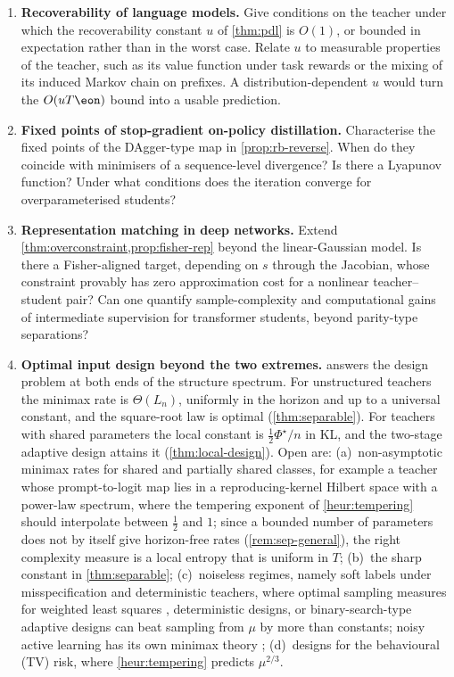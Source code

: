 \begin{enumerate}[leftmargin=*,label=\textbf{P\arabic*.}]
\item \textbf{Recoverability of language models.} Give conditions on the teacher under which the
recoverability constant $u$ of \cref{thm:pdl} is $O(1)$, or bounded in expectation rather than in the worst case.
Relate $u$ to measurable properties of the teacher, such as its value function under task rewards or the
mixing of its induced Markov chain on prefixes. A distribution-dependent $u$ would turn the $O(uT\eon)$
bound into a usable prediction.

\item \textbf{Fixed points of stop-gradient on-policy distillation.} Characterise the fixed points of the
DAgger-type map in \cref{prop:rb-reverse}. When do they coincide with minimisers of a sequence-level
divergence? Is there a Lyapunov function? Under what conditions does the iteration converge for
overparameterised students?

\item \textbf{Representation matching in deep networks.} Extend \cref{thm:overconstraint,prop:fisher-rep} beyond the
linear-Gaussian model. Is there a Fisher-aligned target, depending on $s$ through the Jacobian, whose
constraint provably has zero approximation cost for a nonlinear teacher--student pair? Can one quantify
sample-complexity and computational gains of intermediate supervision for transformer students, beyond
parity-type separations?

\item \textbf{Optimal input design beyond the two extremes.}  answers the design problem
at both ends of the structure spectrum. For unstructured teachers the minimax rate is $\Theta(L_n)$,
uniformly in the horizon and up to a universal constant, and the square-root law is optimal
(\cref{thm:separable}). For teachers with shared parameters the local constant is $\frac12\Phi^\star/n$ in KL,
and the two-stage adaptive design attains it (\cref{thm:local-design}). Open are: (a)~non-asymptotic
minimax rates for shared and partially shared classes, for example a teacher whose prompt-to-logit map
lies in a reproducing-kernel Hilbert space with a power-law spectrum, where the tempering exponent of
\cref{heur:tempering} should interpolate between $\frac12$ and $1$; since a bounded number of parameters does
not by itself give horizon-free rates (\cref{rem:sep-general}), the right complexity measure is a local
entropy that is uniform in $T$; (b)~the sharp constant in \cref{thm:separable}; (c)~noiseless regimes,
namely soft labels under misspecification and deterministic teachers, where optimal sampling measures
for weighted least squares \citep{cohen2017optimal}, deterministic designs, or binary-search-type
adaptive designs \citep{dasgupta2005coarse} can beat sampling from $\mu$ by more than constants; noisy active
learning has its own minimax theory \citep{castro2008minimax}; (d)~designs for the behavioural (TV) risk,
where \cref{heur:tempering} predicts $\mu^{2/3}$.


\end{enumerate}
